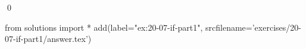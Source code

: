 
\begin{ex}
  \label{ex:20-07-if-part1}
  
  \qed
\end{ex}
\begin{python0}
from solutions import *
add(label="ex:20-07-if-part1",
    srcfilename='exercises/20-07-if-part1/answer.tex')
\end{python0}
